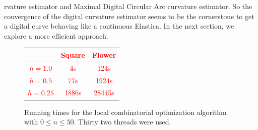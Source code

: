 \documentclass[smallextended]{svjour3}       %
\newcommand{\revision}[1]{\textcolor{red}{#1}}
\begin{document}
rvature estimator and Maximal Digital Circular Arc curvature estimator. So the convergence of the digital curvature
estimator seems to be the cornerstone to get a digital curve behaving like a continuous Elastica.  In the next section,
we explore a more efficient approach.

\begin{figure}
	\center
	\captionsetup{type=table}	
	\revision{
	\begin{tabular}{|c|c|c|}
	\hline
	& Square & Flower \\
	\hline
	$h=1.0$ & 4s & 124s \\
	\hline
	$h=0.5$ & 77s & 1924s\\
	\hline
	$h=0.25$ & 1886s & 28445s\\
	\hline
	\end{tabular}
	}
	\caption{Running times for the local combinatorial optimization algorithm with $0 \leq n \leq 50$. Thirty two threads were used.}
	\label{tab:summary-local-comb-rtime}
\end{figure}
\end{document}
